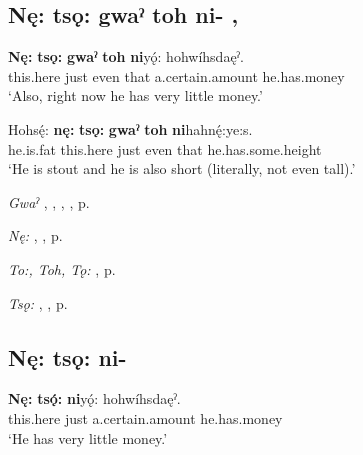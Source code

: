 \subsection*{\textbf{Nę: tsǫ: gwaˀ toh ni-} , } \label{p:[nę: tsǫ: gwaˀ toh ni-]}

\ea
\label{ex:npar115}
\gll \textbf{Nę:} \textbf{tsǫ:} \textbf{gwaˀ} \textbf{toh} \textbf{ni}yǫ́: hohwíhsdaęˀ.\\
this.here just even that a.certain.amount he.has.money\\
\glt ‘Also, right now he has very little money.’
\z

\ea
\label{ex:npar116}
\gll Hohsę́: \textbf{nę:} \textbf{tsǫ:} \textbf{gwaˀ} \textbf{toh} \textbf{ni}hahnę́:ye:s. \\
he.is.fat this.here just even that he.has.some.height\\
\glt ‘He is stout and he is also short (literally, not even tall).’
\z

\begin{CayugaRelated}
\item \textit{Gwaˀ} , , , , p. \pageref{p:[gwaˀ] ‘immediately’}\\
\item \textit{Nę:} , , p. \pageref{p:[nę:] ‘this, these’}\\
\item \textit{To:, Toh, Tǫ:} , p. \pageref{p:[to:] ‘that one’}\\
\item \textit{Tsǫ:} , , p. \pageref{p:[tsǫ:]}
\end{CayugaRelated}

\subsection*{\textbf{Nę: tsǫ: ni-} } \label{p:[nę: tsǫ: ni-]}

\ea
\label{ex:npar117}
\gll \textbf{Nę:} \textbf{tsǫ́:} \textbf{ni}yǫ́: hohwíhsdaęˀ. \\
this.here just a.certain.amount he.has.money\\
\glt ‘He has very little money.’
\z

